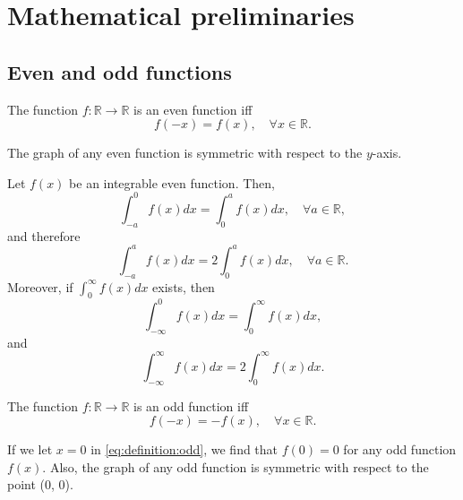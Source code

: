 \chapter{Mathematical preliminaries}

\section{Even and odd functions}
\begin{definition}
    The function $ f : \mathbb{R} \rightarrow \mathbb{R} $ is an even function iff
    \begin{equation}
        f(-x) = f(x), \quad \forall x \in \mathbb{R}.
        \label{eq:definition:even}
    \end{equation}
\end{definition}
The graph of any even function is symmetric with respect to the $ y $-axis.

\begin{lemma}
    Let $ f(x) $ be an integrable even function. Then,
    \begin{equation}
        \int_{-a}^{0} f(x) dx = \int_{0}^{a} f(x) dx, \quad \forall a \in \mathbb{R},
    \end{equation}
    and therefore
    \begin{equation}
        \int_{-a}^{a} f(x) dx = 2 \int_{0}^{a} f(x) dx, \quad \forall a \in \mathbb{R}.
    \end{equation}
    Moreover, if $ \int_{0}^{\infty} f(x) dx $ exists, then
    \begin{equation}
        \int_{-\infty}^{0} f(x) dx = \int_{0}^{\infty} f(x) dx,
    \end{equation}
    and
    \begin{equation}
        \int_{-\infty}^{\infty} f(x) dx = 2 \int_{0}^{\infty} f(x) dx.
    \end{equation}
\end{lemma}

\begin{definition}
    The function $ f : \mathbb{R} \rightarrow \mathbb{R} $ is an odd function iff
    \begin{equation}
        f(-x) = -f(x), \quad \forall x \in \mathbb{R}.
        \label{eq:definition:odd}
    \end{equation}
\end{definition}
If we let $ x = 0 $ in \eqref{eq:definition:odd}, we find that $ f(0) = 0 $ for any odd function $ f(x) $.
Also, the graph of any odd function is symmetric with respect to the point (0, 0).


